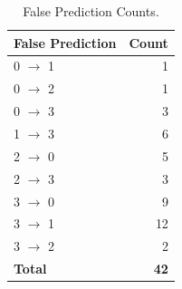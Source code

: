 \renewcommand{\arraystretch}{2}
\begin{table}
	\caption{False Prediction Counts.} \label{tab:false_pred_count}
	
	\begin{center}
		\begin{tabular}{ | l | r | }
			\hline
			\textbf{False Prediction} & \textbf{Count} \\ \hline
			0 $\rightarrow$ 1  & 1   \\ \hline
			0 $\rightarrow$ 2  & 1  \\ \hline
			0 $\rightarrow$ 3  & 3  \\ \hline
			1 $\rightarrow$ 3  & 6  \\ \hline
			2 $\rightarrow$ 0  & 5  \\ \hline
			2 $\rightarrow$ 3  & 3  \\ \hline
			3 $\rightarrow$ 0  & 9  \\ \hline
			3 $\rightarrow$ 1  & 12 \\ \hline
			3 $\rightarrow$ 2  & 2  \\ \hline
			\textbf{Total}   & \textbf{42}  \\ \hline
		\end{tabular}
	\end{center}
	
\end{table}